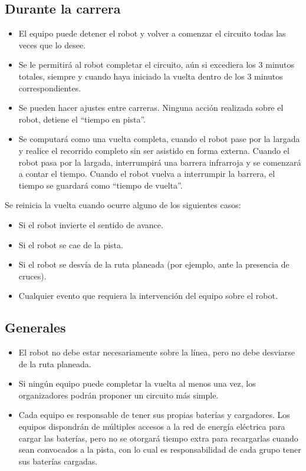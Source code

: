 \documentclass[a4paper,11pt]{article}
\begin{document}
\subsection*{Durante la carrera}
\begin{itemize}
  \item El equipo puede detener el robot y volver a comenzar el circuito todas las veces que lo desee.
  \item Se le permitirá al robot completar el circuito, aún si excediera los 3 minutos totales, siempre y cuando haya iniciado la vuelta dentro de los 3 minutos correspondientes.
  \item Se pueden hacer ajustes entre carreras. Ninguna acción realizada sobre el robot, detiene el ``tiempo en pista''.
  \item Se computará como una vuelta completa, cuando el robot pase por la largada y realice el recorrido completo sin ser asistido en forma externa. Cuando el robot pasa por la largada, interrumpirá una barrera infrarroja y se comenzará a contar el tiempo. Cuando el robot vuelva a interrumpir la barrera, el tiempo se guardará como ``tiempo de vuelta''.
\end{itemize}    

Se reinicia la vuelta cuando ocurre alguno de los siguientes casos:
\begin{itemize}
  \item Si el robot invierte el sentido de avance.
  \item Si el robot se cae de la pista.
  \item Si el robot se desvía de la ruta planeada (por ejemplo, ante la presencia de cruces).
  \item Cualquier evento que requiera la intervención del equipo sobre el robot.
\end{itemize}    

\subsection*{Generales}
\begin{itemize}
  \item El robot no debe estar necesariamente sobre la línea, pero no debe desviarse de la ruta planeada.
  \item Si ningún equipo puede completar la vuelta al menos una vez, los organizadores podrán proponer un circuito más simple.
  \item Cada equipo es responsable de tener sus propias baterías y cargadores. Los equipos dispondrán de múltiples accesos a la red de energía eléctrica para cargar las baterías, pero no se otorgará tiempo extra para recargarlas cuando sean convocados a la pista, con lo cual es responsabilidad de cada grupo tener sus baterías cargadas.
\end{itemize}    
\end{document}
